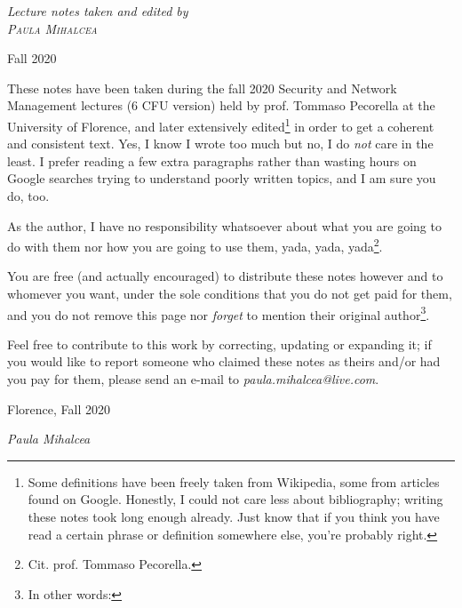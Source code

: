 \documentclass[
12pt, %
english, %
singlespacing, %
headsepline, %
]{notes_class} %
\begin{document}
\begin{titlepage}
\begin{center}
\large \textit{Lecture notes taken and edited by\\
\textsc{Paula Mihalcea}}\\

\vfill

\vspace*{6cm}
{\large Fall 2020} %
 
\vfill
\end{center}
\end{titlepage}


\begin{declaration}

These notes have been taken during the fall 2020 Security and Network Management lectures (6 CFU version) held by prof. Tommaso Pecorella at the University of Florence, and later extensively edited\footnote{Some definitions have been freely taken from Wikipedia, some from articles found on Google. Honestly, I could not care less about bibliography; writing these notes took long enough already. Just know that if you think you have read a certain phrase or definition somewhere else, you're probably right.} in order to get a coherent and consistent text. Yes, I know I wrote too much but no, I do \textit{not} care in the least. I prefer reading a few extra paragraphs rather than wasting hours on Google searches trying to understand poorly written topics, and I am sure you do, too.

As the author, I have no responsibility whatsoever about what you are going to do with them nor how you are going to use them, yada, yada, yada\footnote{Cit. prof. Tommaso Pecorella.}.

You are free (and actually encouraged) to distribute these notes however and to whomever you want, under the sole conditions that you do not get paid for them, and you do not remove this page nor \textit{forget} to mention their original author\footnote{In other words: \doclicenseThis}.

Feel free to contribute to this work by correcting, updating or expanding it; if you would like to report someone who claimed these notes as theirs and/or had you pay for them, please send an e-mail to \textit{paula.mihalcea@live.com}.

\begin{flushright}
Florence, Fall 2020

\textit{Paula Mihalcea}
\end{flushright}

\end{declaration}
\end{document}
